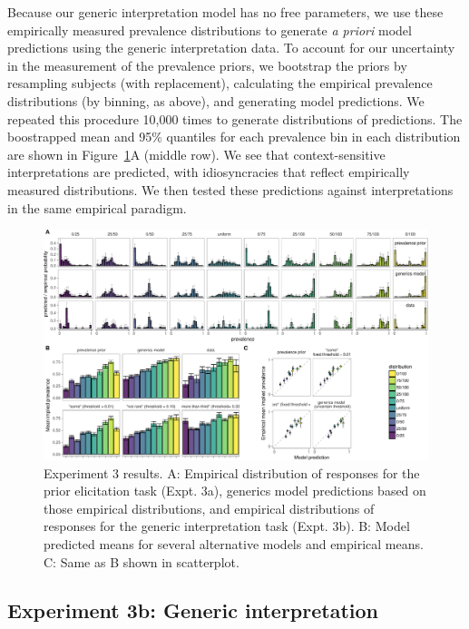 \documentclass[floatsintext,doc]{apa6}
\theoremstyle{definition}
\theoremstyle{definition}
\theoremstyle{definition}
\theoremstyle{remark}
\begin{document}
Because our generic interpretation model has no free parameters, we use
these empirically measured prevalence distributions to generate \emph{a
priori} model predictions using the generic interpretation data. To
account for our uncertainty in the measurement of the prevalence priors,
we bootstrap the priors by resampling subjects (with replacement),
calculating the empirical prevalence distributions (by binning, as
above), and generating model predictions. We repeated this procedure
10,000 times to generate distributions of predictions. The boostrapped
mean and 95\% quantiles for each prevalence bin in each distribution are
shown in Figure~\ref{fig:priorManipulationResults}A (middle row). We see
that context-sensitive interpretations are predicted, with
idiosyncracies that reflect empirically measured distributions. We then
tested these predictions against interpretations in the same empirical
paradigm.

\begin{figure}
\centering
\includegraphics{genint_files/figure-latex/priorManipulationResults-1.pdf}
\caption{\label{fig:priorManipulationResults}Experiment 3 results. A:
Empirical distribution of responses for the prior elicitation task
(Expt. 3a), generics model predictions based on those empirical
distributions, and empirical distributions of responses for the generic
interpretation task (Expt. 3b). B: Model predicted means for several
alternative models and empirical means. C: Same as B shown in
scatterplot. }
\end{figure}

\subsection{Experiment 3b: Generic
interpretation}\label{experiment-3b-generic-interpretation}
\end{document}

